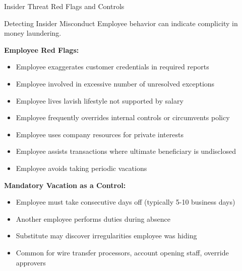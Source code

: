 \documentclass[11pt,a4paper]{beamer}
\begin{document}
	\begin{frame}{Insider Threat Red Flags and Controls}
		\begin{block}{Detecting Insider Misconduct}
			Employee behavior can indicate complicity in money laundering.
		\end{block}
		\textbf{Employee Red Flags:}
		\begin{itemize}
			\item Employee exaggerates customer credentials in required reports
			\item Employee involved in excessive number of unresolved exceptions
			\item Employee lives lavish lifestyle not supported by salary
			\item Employee frequently overrides internal controls or circumvents policy
			\item Employee uses company resources for private interests
			\item Employee assists transactions where ultimate beneficiary is undisclosed
			\item Employee avoids taking periodic vacations
		\end{itemize}
		\textbf{Mandatory Vacation as a Control:}
		\begin{itemize}
			\item Employee must take consecutive days off (typically 5-10 business days)
			\item Another employee performs duties during absence
			\item Substitute may discover irregularities employee was hiding
			\item Common for wire transfer processors, account opening staff, override approvers
		\end{itemize}
	\end{frame}
	
	
\end{document}
